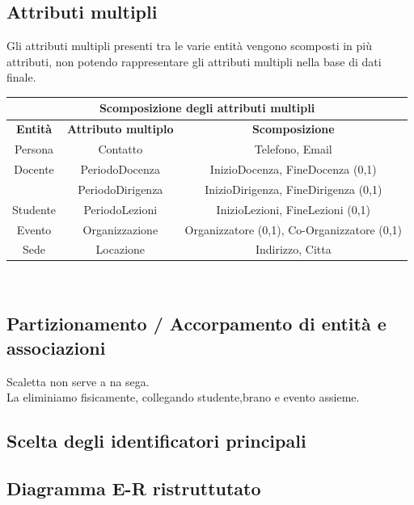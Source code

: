 \documentclass[11pt]{article}
\begin{document}
	\subsection{Attributi multipli}
		Gli attributi multipli presenti tra le varie entità vengono scomposti in più attributi, non potendo rappresentare gli attributi multipli nella base di dati finale.\\
		\begin{tabular}{|c|c|c|}
			\hline
			\multicolumn{3}{|c|}{Scomposizione degli attributi multipli}\\
			\hline
			\textbf{Entità} & \textbf{Attributo multiplo} & \textbf{Scomposizione}\\
			\hline
			Persona&Contatto&Telefono, Email\\
			\hline
			Docente&PeriodoDocenza&InizioDocenza, FineDocenza (0,1)\\
			&PeriodoDirigenza&InizioDirigenza, FineDirigenza (0,1)\\
			\hline
			Studente&PeriodoLezioni&InizioLezioni, FineLezioni (0,1)\\
			\hline
			Evento&Organizzazione&Organizzatore (0,1), Co-Organizzatore (0,1)\\
			\hline
			Sede&Locazione&Indirizzo, Citta\\
			\hline
		\end{tabular}\\
	\subsection{Partizionamento / Accorpamento di entità e associazioni}
		Scaletta non serve a na sega.\\
		La eliminiamo fisicamente, collegando studente,brano e evento assieme.
	\subsection{Scelta degli identificatori principali}
	\subsection{Diagramma E-R ristruttutato}
		
\end{document}
